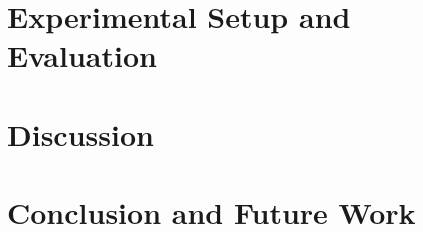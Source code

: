 \documentclass[english,twoside,openright,a4paper,censored,csm,software-track-2020]{HYthesisML}
\begin{document}
\chapter{Experimental Setup and Evaluation\label{chapter:eval}}

\chapter{Discussion\label{chapter:discussion}}

\chapter{Conclusion and Future Work\label{chapter:conclusions}}


\cleardoublepage %

\printbibliography
\end{document}
